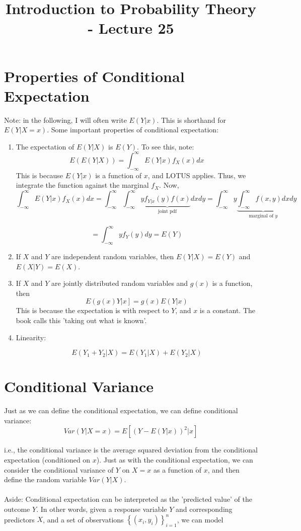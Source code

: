 \documentclass[12pt]{article} %
\date{}
\title{Introduction to Probability Theory - Lecture 25}
\newcommand{\infi}{\int_{-\infty}^\infty}
\begin{document}
\maketitle

\section{Properties of Conditional Expectation}
Note: in the following, I will often write $E(Y|x)$. This is shorthand for $E(Y|X=x)$.  Some important properties of conditional expectation:\\
\begin{enumerate}
\item The expectation of $E(Y|X)$ is $E(Y)$. To see this, note:
$$E(E(Y|X)) = \infi E(Y|x) f_X(x) dx$$
This is because $E(Y|x)$ is a function of $x$, and LOTUS applies. Thus, we integrate the function against the marginal $f_X$. Now,
$$ \infi E(Y|x) f_X(x) dx = \infi \infi y \underbrace{f_{Y|x}(y) f(x)}_{\textrm{joint pdf}} dx dy = \infi y \underbrace{\infi f(x,y) dx}_{\textrm{marginal of } y} dy$$

$$ = \infi y f_Y(y) dy = E(Y)$$

\item If $X$ and $Y$ are independent random variables, then $E(Y|X) = E(Y)$ and $E(X|Y) = E(X)$.

\item If $X$ and $Y$ are jointly distributed random variables and $g(x)$ is a function, then
$$E\left(g(x) Y  |x\right] = g(x)E(Y|x)$$
This is because the expectation is with respect to $Y$, and $x$ is a constant. The book calls this 'taking out what is known'.

\item Linearity:

$$E(Y_1+Y_2|X) = E(Y_1|X) +E(Y_2|X)$$

\end{enumerate}

\section{Conditional Variance}
Just as we can define the conditional expectation, we can define conditional variance:
$$Var(Y|X=x) = E\left[\left(Y-E(Y|x)\right)^2|x\right]$$

i.e., the conditional variance is the average squared deviation from the conditional expectation (conditioned on $x$). Just as with the conditional expectation, we can consider the conditional variance of $Y$ on $X=x$ as a function of $x$, and then define the random variable $Var(Y|X)$. \\\\
Aside: Conditional expectation can be interpreted as the 'predicted value' of the outcome $Y$. In other words, given a response variable $Y$ and corresponding predictors $X$, and a set of observations $\left\{(x_i,y_i)\right\}_{i=1}^n$, we can model
\end{document}
